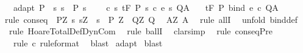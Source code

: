 \begin{isabellebody}
\ \ \ adapt{\isacharcolon}\ {\isachardoublequoteopen}P\ {\isasymsubseteq}\ {\isacharbraceleft}s{\isachardot}\ s\ {\isasymin}\ P{\isacharprime}\ s{\isacharbraceright}{\isachardoublequoteclose}\ \isanewline
\ \ \ c{\isacharcolon}\ {\isachardoublequoteopen}{\isasymforall}s{\isachardot}\ {\isasymGamma}{\isacharcomma}{\isasymTheta}{\isasymturnstile}\isactrlsub t\isactrlbsub {\isacharslash}F\isactrlesub \ {\isacharparenleft}P{\isacharprime}\ s{\isacharparenright}\ {\isacharparenleft}c\ {\isacharparenleft}e\ s{\isacharparenright}{\isacharparenright}\ Q{\isacharcomma}A{\isachardoublequoteclose}\isanewline
\ \ \ {\isachardoublequoteopen}{\isasymGamma}{\isacharcomma}{\isasymTheta}{\isasymturnstile}\isactrlsub t\isactrlbsub {\isacharslash}F\isactrlesub \ P\ {\isacharparenleft}bind\ e\ c{\isacharparenright}\ Q{\isacharcomma}A{\isachardoublequoteclose}\ \isanewline
%
\isadelimproof
%
\endisadelimproof
%
\isatagproof
{}\isamarkupfalse%
\ {\isacharparenleft}rule\ conseq\ {\isacharbrackleft}\ P{\isacharprime}{\isacharequal}{\isachardoublequoteopen}{\isasymlambda}Z{\isachardot}\ {\isacharbraceleft}s{\isachardot}\ s{\isacharequal}Z\ {\isasymand}\ s\ {\isasymin}\ P{\isacharprime}\ Z{\isacharbraceright}{\isachardoublequoteclose}\ \ Q{\isacharprime}{\isacharequal}{\isachardoublequoteopen}{\isasymlambda}Z{\isachardot}\ Q{\isachardoublequoteclose}\ \ \isanewline
A{\isacharprime}{\isacharequal}{\isachardoublequoteopen}{\isasymlambda}Z{\isachardot}\ A{\isachardoublequoteclose}{\isacharbrackright}{\isacharparenright}\isanewline
{}\isamarkupfalse%
\ \ {\isacharparenleft}rule\ allI{\isacharparenright}\isanewline
{}\isamarkupfalse%
\ \ {\isacharparenleft}unfold\ bind{\isacharunderscore}def{\isacharparenright}\isanewline
{}\isamarkupfalse%
\ \ {\isacharparenleft}rule\ HoareTotalDef{\isachardot}DynCom{\isacharparenright}\isanewline
{}\isamarkupfalse%
\ \ {\isacharparenleft}rule\ ballI{\isacharparenright}\isanewline
{}\isamarkupfalse%
\ \ clarsimp\isanewline
{}\isamarkupfalse%
\ \ {\isacharparenleft}rule\ conseqPre{\isacharparenright}\isanewline
{}\isamarkupfalse%
\ \ \ {\isacharparenleft}rule\ c\ {\isacharbrackleft}rule{\isacharunderscore}format{\isacharbrackright}{\isacharparenright}\isanewline
{}\isamarkupfalse%
\ \ blast\isanewline
{}\isamarkupfalse%
\ adapt\isanewline
{}\isamarkupfalse%
\ blast\isanewline

\end{isabellebody}
